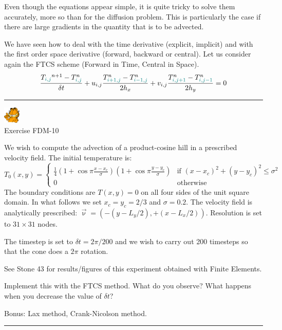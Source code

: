 Even though the equations appear simple, it is quite tricky to solve them accurately, 
more so than for the diffusion problem. 
This is particularly the case if there are large gradients in the quantity that is to be advected. 

We have seen how to deal with the time derivative (explicit, implicit) 
and with the first order space derivative (forward, backward or central).
Let us consider again the FTCS scheme (Forward in Time, Central in Space).
\[
\frac{T_{\color{teal}i,j}^{n+1}-T^n_{\color{teal}i,j}}{\delta t} 
+ u_{i,j} \frac{T^n_{\color{teal}i+1,j} - T^n_{{\color{teal}i-1,j}}}{2h_x} 
+ v_{i,j} \frac{T^n_{\color{teal}i,j+1} - T^n_{{\color{teal}i,j-1}}}{2h_y} =0 
\]


\begin{center}
\begin{minipage}[t]{0.77\textwidth}
\par\noindent\rule{\textwidth}{0.4pt}
\begin{center}
\includegraphics[width=0.8cm]{images/garftr} \\
{\color{orange} Exercise FDM-10}
\end{center}

We wish to compute the advection of a product-cosine hill
in a prescribed velocity field. The initial temperature is:
\[
T_0(x,y)=
\left\{
\begin{array}{cc}
\frac{1}{4}
\left(1+\cos \pi\frac{x-x_c}{\sigma}\right)
\left(1+\cos \pi\frac{y-y_c}{\sigma}\right)
& \text{if } (x-x_c)^2+(y-y_c)^2\leq \sigma^2 \\
0 & \text{otherwise}
\end{array} 
\right.
\]
The boundary conditions are $T(x,y)=0$ on all four sides of the unit square domain. 
In what follows we set $x_c=y_c=2/3$ and $\sigma=0.2$.  
The velocity field is analytically prescribed: $\vec\upnu=(-(y-L_y/2),+(x-L_x/2))$.
Resolution is set to $31\times31$ nodes.

The timestep is set to $\delta t=2\pi/200$ and we wish to carry out 200
timesteps so that the cone does a $2\pi$ rotation.

See Stone 43 for results/figures of this experiment obtained 
with Finite Elements.

Implement this with the FTCS method. What do you observe? What happens when you decrease 
the value of $\delta t$? 

Bonus: Lax method, Crank-Nicolson method.

\par\noindent\rule{\textwidth}{0.4pt}
\end{minipage}
\end{center}

